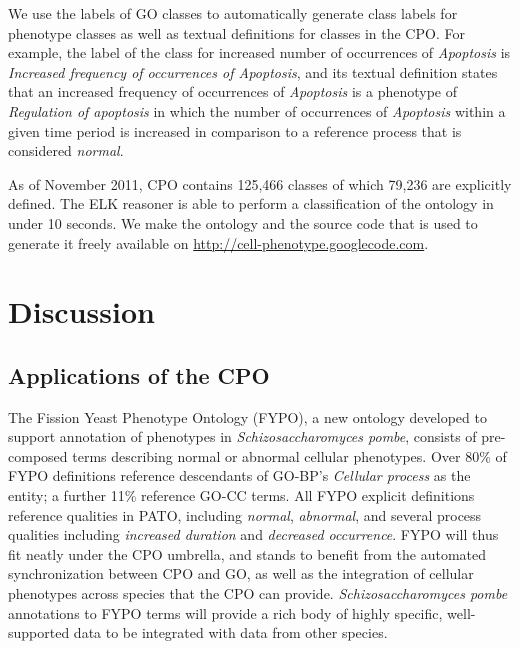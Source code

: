 \documentclass[12pt]{article}
\renewcommand{\cite}{\citep}
\begin{document}
We use the labels of GO classes to automatically generate class labels
for phenotype classes as well as textual definitions for classes in
the CPO. For example, the label of the class for increased number of
occurrences of {\em Apoptosis} is {\em Increased frequency of
  occurrences of Apoptosis}, and its textual definition states that an
increased frequency of occurrences of {\em Apoptosis} is a phenotype
of {\em Regulation of apoptosis} in which the number of occurrences of
{\em Apoptosis} within a given time period is increased in comparison
to a reference process that is considered {\em normal}.

As of November 2011, CPO contains 125,466 classes of which 79,236 are
explicitly defined.  The ELK reasoner \cite{Kazakov2011} is able to
perform a classification of the ontology in under 10 seconds. We make
the ontology and the source code that is used to generate it freely
available on \url{http://cell-phenotype.googlecode.com}.

\section{Discussion}

\subsection{Applications of the CPO}
The Fission Yeast Phenotype Ontology (FYPO), a new ontology developed
to support annotation of phenotypes in {\em Schizosaccharomyces
  pombe}, consists of pre-composed terms describing normal or abnormal
cellular phenotypes. Over 80\% of FYPO definitions reference
descendants of GO-BP's {\em Cellular process} as the entity; a further
11\% reference GO-CC terms. All FYPO explicit definitions reference
qualities in PATO, including {\em normal}, {\em abnormal}, and several
process qualities including {\em increased duration} and {\em
  decreased occurrence}. FYPO will thus fit neatly under the CPO
umbrella, and stands to benefit from the automated synchronization
between CPO and GO, as well as the integration of cellular phenotypes
across species that the CPO can provide. {\em Schizosaccharomyces
  pombe} annotations to FYPO terms will provide a rich body of highly
specific, well-supported data to be integrated with data from other
species.

\end{document}
